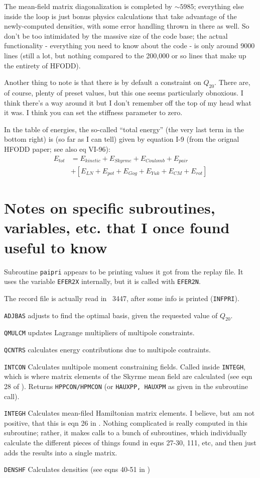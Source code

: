 The mean-field matrix diagonalization is completed by $\sim5985$; everything else inside the loop is just bonus physics calculations that take advantage of the newly-computed densities, with some error handling thrown in there as well. So don't be too intimidated by the massive size of the code base; the actual functionality - everything you need to know about the code - is only around 9000 lines (still a lot, but nothing compared to the 200,000 or so lines that make up the entirety of HFODD).

Another thing to note is that there is by default a constraint on $Q_{20}$. There are, of course, plenty of preset values, but this one seems particularly obnoxious. I think there's a way around it but I don't remember off the top of my head what it was. \rightarrow I think you can set the stiffness parameter to zero.

In the table of energies, the so-called ``total energy'' (the very last term in the bottom right) is (so far as I can tell) given by equation I-9 (from the orignal HFODD paper; see also eq VI-96):
\begin{align}
E_{tot} &= E_{kinetic} + E_{Skyrme} + E_{Coulomb} + E_{pair} \\
& + \left[ E_{LN} + E_{pot} + E_{Gog} + E_{Yuk} + E_{CM} + E_{rot} \right]
\end{align}

\section*{Notes on specific subroutines, variables, etc. that I once found useful to know}

Subroutine \texttt{paipri} appears to be printing values it got from the replay file. It uses the variable \texttt{EFER2X} internally, but it is called with \texttt{EFER2N}.

The record file is actually read in ~3447, after some info is printed (\texttt{INFPRI}).

\texttt{ADJBAS} adjusts to find the optimal basis, given the requested value of $Q_{20}$.

\texttt{QMULCM} updates Lagrange multipliers of multipole constraints.

\texttt{QCNTRS} calculates energy contributions due to multipole contraints.

\texttt{INTCON} Calculates multipole moment constraining fields. Called inside \texttt{INTEGH}, which is where matrix elements of the Skyrme mean field are calculated (see eqn 28 of \cite{Dobaczewski1997}). Returns \texttt{HPPCON/HPMCON} (or \texttt{HAUXPP, HAUXPM} as given in the subroutine call).

\texttt{INTEGH} Calculates mean-filed Hamiltonian matrix elements. I believe, but am not positive, that this is eqn 26 in \cite{Dobaczewski1997}. Nothing complicated is really computed in this subroutine; rather, it makes calls to a bunch of subroutines, which individually calculate the different pieces of things found in eqns 27-30, 111, etc, and then just adds the results into a single matrix.

\texttt{DENSHF} Calculates densities (see eqns 40-51 in \cite{Dobaczewski1997})